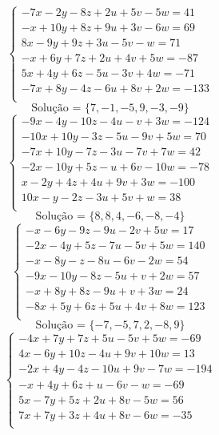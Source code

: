 \documentclass[12pt,oneside,a4paper]{article}
\begin{document}
\vspace{\baselineskip}
\begin{equation*}
\begin{cases}
-7x-2y-8z+2u+5v-5w=41 \\
-x+10y+8z+9u+3v-6w=69 \\
8x-9y+9z+3u-5v-w=71 \\
-x+6y+7z+2u+4v+5w=-87 \\
5x+4y+6z-5u-3v+4w=-71 \\
-7x+8y-4z-6u+8v+2w=-133 \\
\end{cases}
\end{equation*}
\begin{equation*}
\text{Solução = }\{7,-1,-5,9,-3,-9\}
\end{equation*}
\vspace{\baselineskip}
\begin{equation*}
\begin{cases}
-9x-4y-10z-4u-v+3w=-124 \\
-10x+10y-3z-5u-9v+5w=70 \\
-7x+10y-7z-3u-7v+7w=42 \\
-2x-10y+5z-u+6v-10w=-78 \\
x-2y+4z+4u+9v+3w=-100 \\
10x-y-2z-3u+5v+w=38 \\
\end{cases}
\end{equation*}
\begin{equation*}
\text{Solução = }\{8,8,4,-6,-8,-4\}
\end{equation*}
\vspace{\baselineskip}
\begin{equation*}
\begin{cases}
-x-6y-9z-9u-2v+5w=17 \\
-2x-4y+5z-7u-5v+5w=140 \\
-x-8y-z-8u-6v-2w=54 \\
-9x-10y-8z-5u+v+2w=57 \\
-x+8y+8z-9u+v+3w=24 \\
-8x+5y+6z+5u+4v+8w=123 \\
\end{cases}
\end{equation*}
\begin{equation*}
\text{Solução = }\{-7,-5,7,2,-8,9\}
\end{equation*}
\vspace{\baselineskip}
\begin{equation*}
\begin{cases}
-4x+7y+7z+5u-5v+5w=-69 \\
4x-6y+10z-4u+9v+10w=13 \\
-2x+4y-4z-10u+9v-7w=-194 \\
-x+4y+6z+u-6v-w=-69 \\
5x-7y+5z+2u+8v-5w=56 \\
7x+7y+3z+4u+8v-6w=-35 \\
\end{cases}
\end{equation*}
\end{document}
